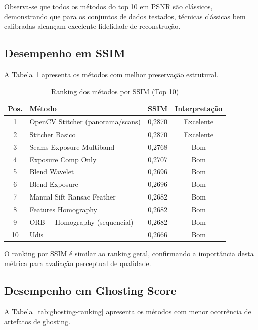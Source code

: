 Observa-se que todos os métodos do top 10 em PSNR são clássicos, demonstrando que para os conjuntos de dados testados, técnicas clássicas bem calibradas alcançam excelente fidelidade de reconstrução.

\subsection{Desempenho em SSIM}

A Tabela~\ref{tab:ssim-ranking} apresenta os métodos com melhor preservação estrutural.

\begin{table}[htb]
\centering
\caption{Ranking dos métodos por SSIM (Top 10)}
\label{tab:ssim-ranking}
\small
\begin{tabular}{clcc}
\hline
\textbf{Pos.} & \textbf{Método} & \textbf{SSIM} & \textbf{Interpretação} \\ \hline
1 & OpenCV Stitcher (panorama/scans) & 0,2870 & Excelente \\
2 & Stitcher Basico & 0,2870 & Excelente \\
3 & Seams Exposure Multiband & 0,2768 & Bom \\
4 & Exposure Comp Only & 0,2707 & Bom \\
5 & Blend Wavelet & 0,2696 & Bom \\
6 & Blend Exposure & 0,2696 & Bom \\
7 & Manual Sift Ransac Feather & 0,2682 & Bom \\
8 & Features Homography & 0,2682 & Bom \\
9 & ORB + Homography (sequencial) & 0,2682 & Bom \\
10 & Udis & 0,2666 & Bom \\
\hline
\end{tabular}
\end{table}

O ranking por SSIM é similar ao ranking geral, confirmando a importância desta métrica para avaliação perceptual de qualidade.

\subsection{Desempenho em Ghosting Score}

A Tabela~\ref{tab:ghosting-ranking} apresenta os métodos com menor ocorrência de artefatos de ghosting.

